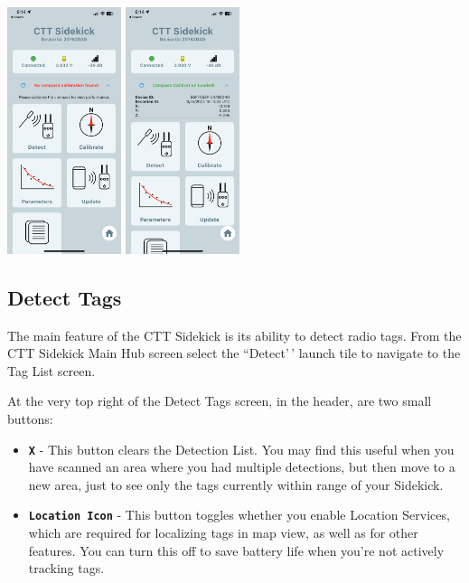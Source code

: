 \documentclass[
]{article}
\begin{document}
\includegraphics[width=0.25\textwidth,height=\textheight]{./images/sidekick_CompassNotCalib.PNG}
\includegraphics[width=0.25\textwidth,height=\textheight]{./images/sidekick_calibratedCompass.PNG}

\hypertarget{detect-tags}{%
\subsection{Detect Tags}\label{detect-tags}}

The main feature of the CTT Sidekick is its ability to detect radio
tags. From the CTT Sidekick Main Hub screen select the ``Detect'\,'
launch tile to navigate to the Tag List screen.

At the very top right of the Detect Tags screen, in the header, are two
small buttons:

\begin{itemize}
\item
  \textbf{\texttt{X}} - This button clears the Detection List. You may
  find this useful when you have scanned an area where you had multiple
  detections, but then move to a new area, just to see only the tags
  currently within range of your Sidekick.
\item
  \textbf{\texttt{Location\ Icon}} - This button toggles whether you
  enable Location Services, which are required for localizing tags in
  map view, as well as for other features. You can turn this off to save
  battery life when you're not actively tracking tags.
\end{itemize}
\end{document}
